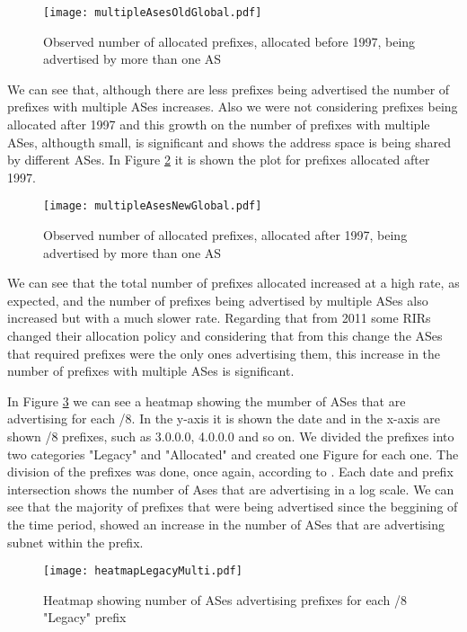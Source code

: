 \documentclass[11pt,a4paper]{scrreprt}
\begin{document}
\begin{figure}[!h]
\centering
\texttt{[image: multipleAsesOldGlobal.pdf]}
\caption{Observed number of allocated prefixes, allocated before 1997, being advertised by more than one AS}
\label{fig:multipleAsesOldGlobal}
\end{figure}

We can see that, although there are less prefixes being advertised the number of prefixes with multiple ASes increases. Also we were not considering prefixes being allocated after 1997 and this growth on the number of prefixes with multiple ASes, althougth small, is significant and shows the address space is being shared by different ASes.
In Figure \ref{fig:multipleAsesNewGlobal} it is shown the plot for prefixes allocated after 1997.

\begin{figure}[!h]
\centering
\texttt{[image: multipleAsesNewGlobal.pdf]}
\caption{Observed number of allocated prefixes, allocated after 1997, being advertised by more than one AS}
\label{fig:multipleAsesNewGlobal}
\end{figure}

We can see that the total number of prefixes allocated increased at a high rate, as expected, and the number of prefixes being advertised by multiple ASes also increased but with a much slower rate. Regarding that from 2011 some RIRs changed their allocation policy and considering that from this change the ASes that required prefixes were the only ones advertising them, this increase in the number of prefixes with multiple ASes is significant.

In Figure \ref{fig:heatmapLegacyMulti} we can see a heatmap showing the mumber of ASes that are advertising for each /8. In the y-axis it is shown the date and in the x-axis are shown /8 prefixes, such as 3.0.0.0, 4.0.0.0 and so on. We divided the prefixes into two categories "Legacy" and "Allocated" and created one Figure for each one. The division of the prefixes was done, once again, according to \cite{IANA_Address_Space}. Each date and prefix intersection shows the number of Ases that are advertising in a log scale. We can see that the majority of prefixes that were being advertised since the beggining of the time period, showed an increase in the number of ASes that are advertising subnet within the prefix.   

\begin{figure}[!h]
\centering
\texttt{[image: heatmapLegacyMulti.pdf]}
\caption{Heatmap showing number of ASes advertising prefixes for each /8 "Legacy" prefix}
\label{fig:heatmapLegacyMulti}
\end{figure}
\end{document}
